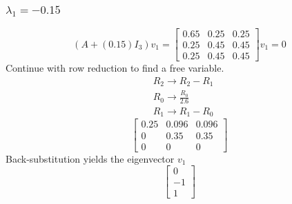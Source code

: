 \documentclass[12pt]{article}
\begin{document}
\subsubsection*{$\lambda_1 = -0.15$}
\begin{equation*}
    (A+(0.15)I_3)v_1=
    \begin{bmatrix}
        0.65 & 0.25 & 0.25 \\
        0.25 & 0.45 & 0.45 \\
        0.25 & 0.45 & 0.45 
    \end{bmatrix}v_1 = 0
\end{equation*}
Continue with row reduction to find a free variable.
\begin{align*}
    &R_2 \to R_2 - R_1\\
    &R_0 \to \frac{R_0}{2.6}\\
    &R_1 \to R_1 - R_0
\end{align*}
\begin{equation*}
    \begin{bmatrix}
        0.25 & 0.096 & 0.096 \\
        0 & 0.35 & 0.35 \\
        0 & 0 & 0 
    \end{bmatrix}
\end{equation*}
Back-substitution yields the eigenvector $v_1$
\begin{equation*}
 \begin{bmatrix}
        0 \\
        -1 \\
        1
    \end{bmatrix}
\end{equation*}
\end{document}
